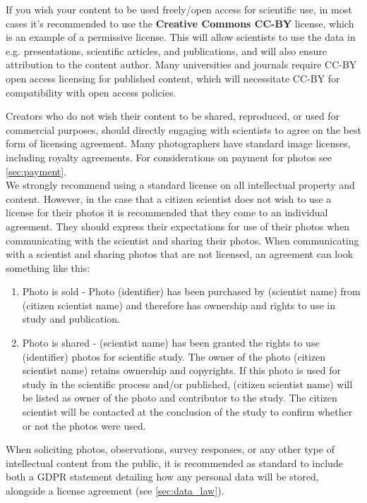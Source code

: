 \documentclass{article}
\begin{document}
If you wish your content to be used freely/open access for scientific use, in most cases it's recommended to use the \textbf{Creative Commons CC-BY} license, which is an example of a permissive license. This will allow scientists to use the data in e.g. presentations, scientific articles, and publications, and will also ensure attribution to the content author. Many universities and journals require CC-BY open access licensing for published content, which will necessitate CC-BY for compatibility with open access policies.

Creators who do not wish their content to be shared, reproduced, or used for commercial purposes, should directly engaging with scientists to agree on the best form of licensing agreement. Many photographers have standard image licenses, including royalty agreements. For considerations on payment for photos see \ref{sec:payment}. \\

We strongly recommend using a standard license on all intellectual property and content. However, in the case that a citizen scientist does not wish to use a license for their photos it is recommended that they come to an individual agreement. They should express their expectations for use of their photos when communicating with the scientist and sharing their photos. When communicating with a scientist and sharing photos that are not licensed, an agreement can look something like this:

\begin{enumerate}
    \item Photo is sold - 
Photo (identifier) has been purchased by (scientist name) from (citizen scientist name) and therefore has ownership and rights to use in study and publication.
\item Photo is shared - (scientist name) has been granted the rights to use (identifier) photos for scientific study.  The owner of the photo (citizen scientist name) retains ownership and copyrights.  If this photo is used for study in the scientific process and/or published, (citizen scientist name) will be listed as owner of the photo and contributor to the study. The citizen scientist will be contacted at the conclusion of the study to confirm whether or not the photos were used.
\end{enumerate}

When soliciting photos, observations, survey responses, or any other type of intellectual content from the public, it is recommended as standard to include both a GDPR statement detailing how any personal data will be stored, alongside a license agreement (see \ref{sec:data_law}).
\end{document}
